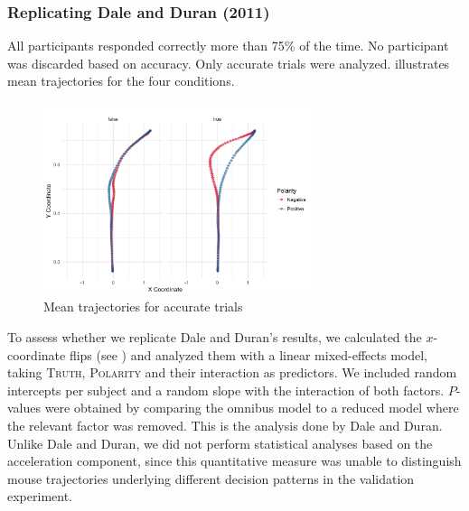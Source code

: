 \documentclass[11pt]{article}
\begin{document}
\subsubsection{Replicating Dale and Duran (2011)}
All participants responded correctly more than 75\% of the time. No participant was discarded based on accuracy. Only accurate trials were analyzed.  illustrates mean trajectories for the four conditions.
\begin{figure}
\centering
\includegraphics[width=0.7\textwidth]{negation-data-mean-trajectory.png}
\caption{Mean trajectories for accurate trials} \label{fig:mean.trajectory-negation}
\end{figure}

To assess whether we replicate Dale and Duran's results, we calculated the $x$-coordinate flips (see ) and analyzed them with a linear mixed-effects model, taking \textsc{Truth}, \textsc{Polarity} and their interaction as predictors. We included random intercepts per subject and a random slope with the interaction of both factors. $P$-values were obtained by comparing the omnibus model to a reduced model where the relevant factor was removed. This is the analysis done by Dale and Duran. 
Unlike Dale and Duran, we did not perform statistical analyses based on the acceleration component, since this quantitative measure was unable to distinguish mouse trajectories underlying different decision patterns in the validation experiment.

\end{document}
